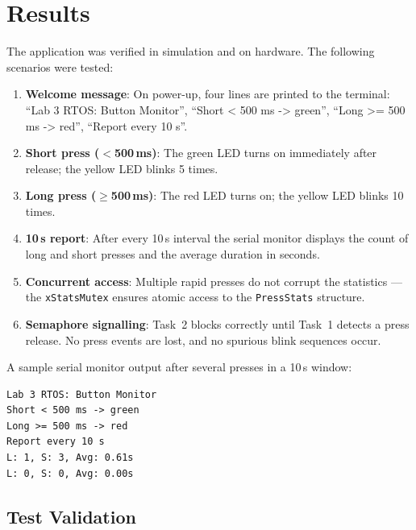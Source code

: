 \documentclass[12pt]{article}
\begin{document}
\section{Results}

The application was verified in simulation and on hardware. The following scenarios were tested:

\begin{enumerate}
  \item \textbf{Welcome message}: On power-up, four lines are printed to the terminal: ``Lab 3 RTOS: Button Monitor'', ``Short < 500 ms -> green'', ``Long >= 500 ms -> red'', ``Report every 10 s''.

  \item \textbf{Short press (\(<\)500\,ms)}: The green LED turns on immediately after release; the yellow LED blinks 5 times.

  \item \textbf{Long press (\(\geq\)500\,ms)}: The red LED turns on; the yellow LED blinks 10 times.

  \item \textbf{10\,s report}: After every 10\,s interval the serial monitor displays the count of long and short presses and the average duration in seconds.

  \item \textbf{Concurrent access}: Multiple rapid presses do not corrupt the statistics — the \texttt{xStatsMutex} ensures atomic access to the \texttt{PressStats} structure.

  \item \textbf{Semaphore signalling}: Task~2 blocks correctly until Task~1 detects a press release. No press events are lost, and no spurious blink sequences occur.
\end{enumerate}

A sample serial monitor output after several presses in a 10\,s window:

\begin{lstlisting}
Lab 3 RTOS: Button Monitor
Short < 500 ms -> green
Long >= 500 ms -> red
Report every 10 s
L: 1, S: 3, Avg: 0.61s
L: 0, S: 0, Avg: 0.00s
\end{lstlisting}

\subsection{Test Validation}
\end{document}
